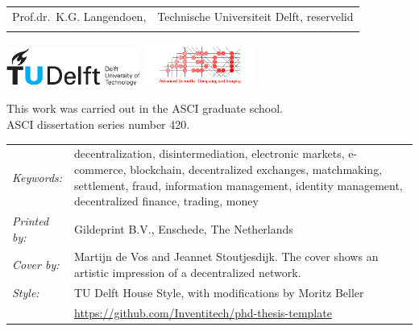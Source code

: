 \begin{titlepage}
\begin{tabular}{p{4.5cm}l}
    Prof.dr.\ K.G. Langendoen, & Technische Universiteit Delft, reservelid \\ \\

\end{tabular}



\medskip
\begin{center}
    \includegraphics[height=0.5in]{title/logos/tudelft}
    \hspace{4em}
    \includegraphics[height=0.55in]{title/logos/asci}
\end{center}
\medskip

\noindent This work was carried out in the ASCI graduate school.\\ASCI dissertation series number 420.


\vfill
\medskip
\medskip

\noindent
\begin{tabular}{@{}p{}@{}p{}}
  \textit{Keywords:} & decentralization, disintermediation, electronic markets, e-commerce, blockchain, decentralized exchanges, matchmaking, settlement, fraud, information management, identity management, decentralized finance, trading, money \\[\medskipamount]
      \textit{Printed by:} & Gildeprint B.V., Enschede, The Netherlands \\[\medskipamount]
      \textit{Cover by:} & Martijn de Vos and Jeannet Stoutjesdijk. The cover shows an artistic impression of a decentralized network.  \\[\medskipamount]
      \textit{Style:} & TU Delft House Style, with modifications by Moritz Beller \\& \url{https://github.com/Inventitech/phd-thesis-template} \\[\medskipamount]
\end{tabular}


\end{titlepage}
